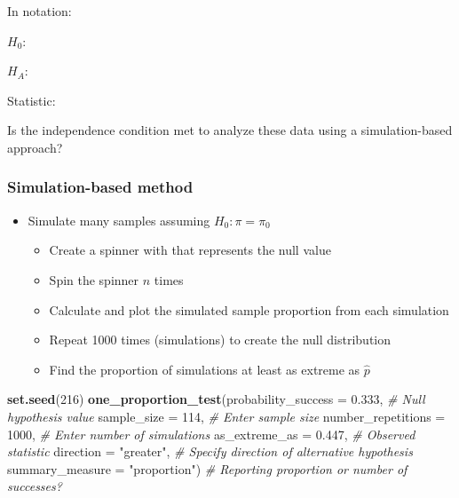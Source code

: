 \documentclass[
]{report}
\newenvironment{Shaded}{\begin{snugshade}}{\end{snugshade}}
\newcommand{\AttributeTok}[1]{\textcolor[rgb]{0.13,0.29,0.53}{#1}}
\newcommand{\CommentTok}[1]{\textcolor[rgb]{0.56,0.35,0.01}{\textit{#1}}}
\newcommand{\DecValTok}[1]{\textcolor[rgb]{0.00,0.00,0.81}{#1}}
\newcommand{\FloatTok}[1]{\textcolor[rgb]{0.00,0.00,0.81}{#1}}
\newcommand{\FunctionTok}[1]{\textcolor[rgb]{0.13,0.29,0.53}{\textbf{#1}}}
\newcommand{\NormalTok}[1]{#1}
\newcommand{\StringTok}[1]{\textcolor[rgb]{0.31,0.60,0.02}{#1}}
\begin{document}
\vspace{0.45in}

In notation:

\(H_0:\)

\vspace{0.15in}

\(H_A:\)

\vspace{0.15in}

Statistic:

\vspace{0.15in}

Is the independence condition met to analyze these data using a simulation-based approach?

\vspace{0.2in}

\hypertarget{simulation-based-method-1}{%
\subsubsection*{Simulation-based method}\label{simulation-based-method-1}}

\begin{itemize}
\item
  Simulate many samples assuming \(H_0: \pi = \pi_0\)

  \begin{itemize}
  \item
    Create a spinner with that represents the null value
  \item
    Spin the spinner \(n\) times
  \item
    Calculate and plot the simulated sample proportion from each simulation
  \item
    Repeat 1000 times (simulations) to create the null distribution
  \item
    Find the proportion of simulations at least as extreme as \(\hat{p}\)
  \end{itemize}
\end{itemize}

\begin{Shaded}
\begin{Highlighting}[]
\FunctionTok{set.seed}\NormalTok{(}\DecValTok{216}\NormalTok{)}
\FunctionTok{one\_proportion\_test}\NormalTok{(}\AttributeTok{probability\_success =} \FloatTok{0.333}\NormalTok{, }\CommentTok{\# Null hypothesis value}
          \AttributeTok{sample\_size =} \DecValTok{114}\NormalTok{, }\CommentTok{\# Enter sample size}
          \AttributeTok{number\_repetitions =} \DecValTok{1000}\NormalTok{, }\CommentTok{\# Enter number of simulations}
          \AttributeTok{as\_extreme\_as =} \FloatTok{0.447}\NormalTok{, }\CommentTok{\# Observed statistic}
          \AttributeTok{direction =} \StringTok{"greater"}\NormalTok{, }\CommentTok{\# Specify direction of alternative hypothesis}
          \AttributeTok{summary\_measure =} \StringTok{"proportion"}\NormalTok{) }\CommentTok{\# Reporting proportion or number of successes?}
\end{Highlighting}
\end{Shaded}
\end{document}
